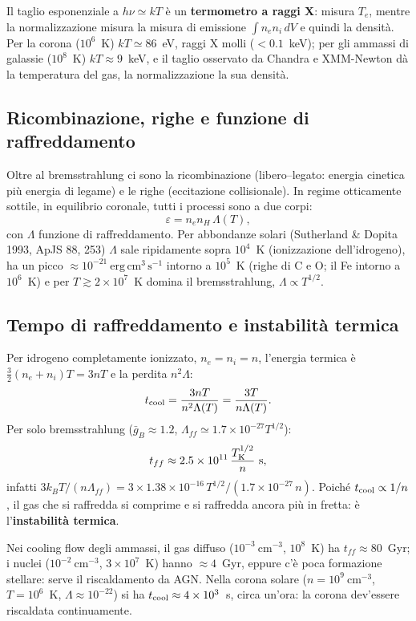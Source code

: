 Il taglio esponenziale a $h\nu\simeq kT$ è un \textbf{termometro a raggi X}: misura $T_e$, mentre la normalizzazione misura la misura di emissione $\int n_en_i\,dV$ e quindi la densità. Per la corona ($10^6$~K) $kT\simeq86$~eV, raggi X molli ($<0.1$~keV); per gli ammassi di galassie ($10^8$~K) $kT\approx9$~keV, e il taglio osservato da Chandra e XMM-Newton dà la temperatura del gas, la normalizzazione la sua densità.

\subsection{Ricombinazione, righe e funzione di raffreddamento}
Oltre al bremsstrahlung ci sono la ricombinazione (libero--legato: energia cinetica più energia di legame) e le righe (eccitazione collisionale). In regime otticamente sottile, in equilibrio coronale, tutti i processi sono a due corpi:
\begin{equation}
\varepsilon=n_en_H\,\Lambda(T),
\end{equation}
con $\Lambda$ funzione di raffreddamento. Per abbondanze solari (Sutherland \& Dopita 1993, ApJS 88, 253) $\Lambda$ sale ripidamente sopra $10^4$~K (ionizzazione dell'idrogeno), ha un picco $\approx10^{-21}~\mathrm{erg\,cm^3\,s^{-1}}$ intorno a $10^5$~K (righe di C e O; il Fe intorno a $10^6$~K) e per $T\gtrsim2\times10^7$~K domina il bremsstrahlung, $\Lambda\propto T^{1/2}$.

\subsection{Tempo di raffreddamento e instabilità termica}
Per idrogeno completamente ionizzato, $n_e=n_i=n$, l'energia termica è $\frac32(n_e+n_i)T=3nT$ e la perdita $n^2\Lambda$:
\begin{equation}
t_{\rm cool}=\frac{3nT}{n^2\Lambda(T)}=\frac{3T}{n\Lambda(T)}.
\end{equation}
Per solo bremsstrahlung ($\bar g_B\approx1.2$, $\Lambda_{ff}\simeq1.7\times10^{-27}T^{1/2}$):
\begin{equation}
t_{ff}\approx2.5\times10^{11}\,\frac{T_{\rm K}^{1/2}}{n}\ \mathrm{s},
\end{equation}
infatti $3k_BT/(n\Lambda_{ff})=3\times1.38\times10^{-16}\,T^{1/2}/(1.7\times10^{-27}\,n)$.
Poiché $t_{\rm cool}\propto1/n$, il gas che si raffredda si comprime e si raffredda ancora più in fretta: è l'\textbf{instabilità termica}.

Nei cooling flow degli ammassi, il gas diffuso ($10^{-3}~\mathrm{cm^{-3}}$, $10^8$~K) ha $t_{ff}\approx80$~Gyr; i nuclei ($10^{-2}~\mathrm{cm^{-3}}$, $3\times10^7$~K) hanno $\approx4$~Gyr, eppure c'è poca formazione stellare: serve il riscaldamento da AGN.
Nella corona solare ($n=10^9~\mathrm{cm^{-3}}$, $T=10^6$~K, $\Lambda\approx10^{-22}$) si ha $t_{\rm cool}\approx4\times10^3$~s, circa un'ora: la corona dev'essere riscaldata continuamente.

